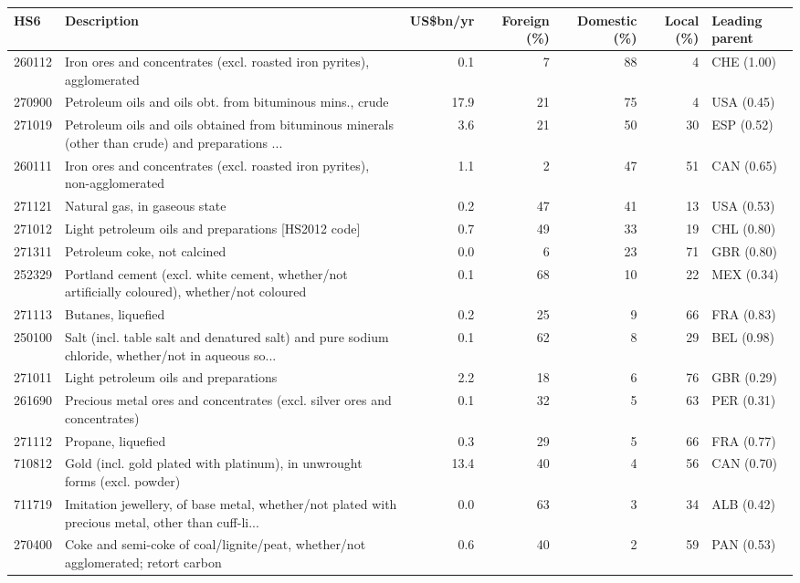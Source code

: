 \begin{tabular}{@{}l p{6.4cm} r r r r l@{}}
\toprule
HS6 & Description & US\$bn/yr & Foreign (\%) & Domestic (\%) & Local (\%) & Leading parent \\
\midrule
260112 & Iron ores and concentrates (excl. roasted iron pyrites), agglomerated & 0.1 & 7 & 88 & 4 & CHE (1.00) \\
270900 & Petroleum oils and oils obt. from bituminous mins., crude & 17.9 & 21 & 75 & 4 & USA (0.45) \\
271019 & Petroleum oils and oils obtained from bituminous minerals (other than crude) and preparations ... & 3.6 & 21 & 50 & 30 & ESP (0.52) \\
260111 & Iron ores and concentrates (excl. roasted iron pyrites), non-agglomerated & 1.1 & 2 & 47 & 51 & CAN (0.65) \\
271121 & Natural gas, in gaseous state & 0.2 & 47 & 41 & 13 & USA (0.53) \\
271012 & Light petroleum oils and preparations [HS2012 code] & 0.7 & 49 & 33 & 19 & CHL (0.80) \\
271311 & Petroleum coke, not calcined & 0.0 & 6 & 23 & 71 & GBR (0.80) \\
252329 & Portland cement (excl. white cement, whether/\allowbreak{}not artificially coloured), whether/\allowbreak{}not coloured & 0.1 & 68 & 10 & 22 & MEX (0.34) \\
271113 & Butanes, liquefied & 0.2 & 25 & 9 & 66 & FRA (0.83) \\
250100 & Salt (incl. table salt and denatured salt) and pure sodium chloride, whether/\allowbreak{}not in aqueous so... & 0.1 & 62 & 8 & 29 & BEL (0.98) \\
271011 & Light petroleum oils and preparations & 2.2 & 18 & 6 & 76 & GBR (0.29) \\
261690 & Precious metal ores and concentrates (excl. silver ores and concentrates) & 0.1 & 32 & 5 & 63 & PER (0.31) \\
271112 & Propane, liquefied & 0.3 & 29 & 5 & 66 & FRA (0.77) \\
710812 & Gold (incl. gold plated with platinum), in unwrought forms (excl. powder) & 13.4 & 40 & 4 & 56 & CAN (0.70) \\
711719 & Imitation jewellery, of base metal, whether/\allowbreak{}not plated with precious metal, other than cuff-li... & 0.0 & 63 & 3 & 34 & ALB (0.42) \\
270400 & Coke and semi-coke of coal/\allowbreak{}lignite/\allowbreak{}peat, whether/\allowbreak{}not agglomerated; retort carbon & 0.6 & 40 & 2 & 59 & PAN (0.53) \\

\end{tabular}
